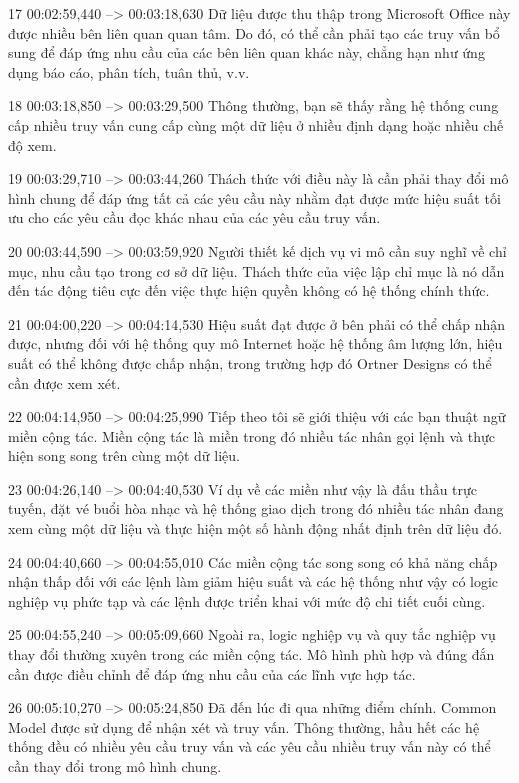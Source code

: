 17
00:02:59,440 --> 00:03:18,630
Dữ liệu được thu thập trong Microsoft Office này được nhiều bên liên quan quan tâm.  Do đó, có thể cần phải tạo các truy vấn bổ sung để đáp ứng nhu cầu của các bên liên quan khác này, chẳng hạn như ứng dụng báo cáo, phân tích, tuân thủ, v.v.

18
00:03:18,850 --> 00:03:29,500
Thông thường, bạn sẽ thấy rằng hệ thống cung cấp nhiều truy vấn cung cấp cùng một dữ liệu ở nhiều định dạng hoặc nhiều chế độ xem.

19
00:03:29,710 --> 00:03:44,260
Thách thức với điều này là cần phải thay đổi mô hình chung để đáp ứng tất cả các yêu cầu này nhằm đạt được mức hiệu suất tối ưu cho các yêu cầu đọc khác nhau của các yêu cầu truy vấn.

20
00:03:44,590 --> 00:03:59,920
Người thiết kế dịch vụ vi mô cần suy nghĩ về chỉ mục, nhu cầu tạo trong cơ sở dữ liệu.  Thách thức của việc lập chỉ mục là nó dẫn đến tác động tiêu cực đến việc thực hiện quyền không có hệ thống chính thức.

21
00:04:00,220 --> 00:04:14,530
Hiệu suất đạt được ở bên phải có thể chấp nhận được, nhưng đối với hệ thống quy mô Internet hoặc hệ thống âm lượng lớn, hiệu suất có thể không được chấp nhận, trong trường hợp đó Ortner Designs có thể cần được xem xét.

22
00:04:14,950 --> 00:04:25,990
Tiếp theo tôi sẽ giới thiệu với các bạn thuật ngữ miền cộng tác.  Miền cộng tác là miền trong đó nhiều tác nhân gọi lệnh và thực hiện song song trên cùng một dữ liệu.

23
00:04:26,140 --> 00:04:40,530
Ví dụ về các miền như vậy là đấu thầu trực tuyến, đặt vé buổi hòa nhạc và hệ thống giao dịch trong đó nhiều tác nhân đang xem cùng một dữ liệu và thực hiện một số hành động nhất định trên dữ liệu đó.

24
00:04:40,660 --> 00:04:55,010
Các miền cộng tác song song có khả năng chấp nhận thấp đối với các lệnh làm giảm hiệu suất và các hệ thống như vậy có logic nghiệp vụ phức tạp và các lệnh được triển khai với mức độ chi tiết cuối cùng.

25
00:04:55,240 --> 00:05:09,660
Ngoài ra, logic nghiệp vụ và quy tắc nghiệp vụ thay đổi thường xuyên trong các miền cộng tác.  Mô hình phù hợp và đúng đắn cần được điều chỉnh để đáp ứng nhu cầu của các lĩnh vực hợp tác.

26
00:05:10,270 --> 00:05:24,850
Đã đến lúc đi qua những điểm chính.  Common Model được sử dụng để nhận xét và truy vấn.  Thông thường, hầu hết các hệ thống đều có nhiều yêu cầu truy vấn và các yêu cầu nhiều truy vấn này có thể cần thay đổi trong mô hình chung.

